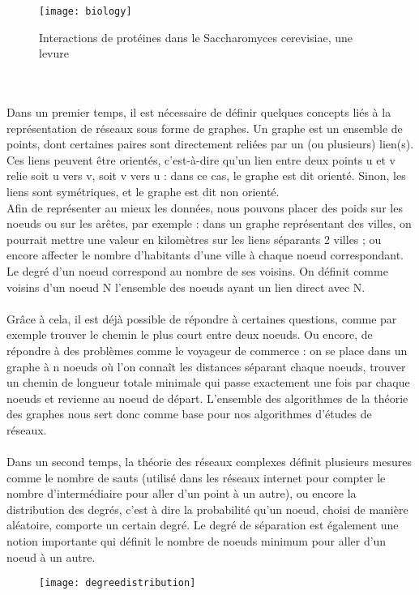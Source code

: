 \begin{titlepage}
{\begin{figure}[h]
\centering
\texttt{[image: biology]}
\caption{Interactions de protéines dans le Saccharomyces cerevisiae, une levure}
\end{figure}
\\ \\
Dans un premier temps, il est nécessaire de définir quelques concepts liés à la représentation de réseaux sous forme de graphes.
Un graphe est un ensemble de points, dont certaines paires sont directement reliées par un (ou plusieurs) lien(s). Ces liens peuvent être orientés, c'est-à-dire qu'un lien entre deux points u et v relie soit u vers v, soit v vers u : dans ce cas, le graphe est dit orienté. Sinon, les liens sont symétriques, et le graphe est dit non orienté. \\ Afin de représenter au mieux les données, nous pouvons placer des poids sur les noeuds ou sur les arêtes, par exemple : dans un graphe représentant des villes, on pourrait mettre une valeur en kilomètres sur les liens séparants 2 villes ; ou encore affecter le nombre d'habitants d'une ville à chaque noeud correspondant. Le degré d'un noeud correspond au nombre de ses voisins. On définit comme voisins d'un noeud N l'ensemble des noeuds ayant un lien direct avec N. 
\\ \\
Grâce à cela, il est déjà possible de répondre à certaines questions, comme par exemple trouver le chemin le plus court entre deux noeuds. Ou encore, de répondre à des problèmes comme le voyageur de commerce : on se place dans un graphe à n noeuds où l'on connaît les distances séparant chaque noeuds, trouver un chemin de longueur totale minimale qui passe exactement une fois par chaque noeuds et revienne au noeud de départ. L'ensemble des algorithmes de la théorie des graphes nous sert donc comme base pour nos algorithmes d'études de réseaux.
\\ \\ 
Dans un second temps, la théorie des réseaux complexes définit plusieurs mesures comme le nombre de sauts (utilisé dans les réseaux internet pour compter le nombre d'intermédiaire pour aller d'un point à un autre), ou encore la distribution des degrés, c'est à dire la probabilité qu'un noeud, choisi de manière aléatoire, comporte un certain degré. Le degré de séparation est également une notion importante qui définit le nombre de noeuds minimum pour aller d'un noeud à un autre.
\begin{figure}[h]
\centering
\texttt{[image: degreedistribution]}

\end{figure}}
\end{titlepage}
